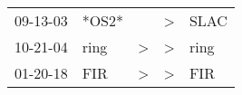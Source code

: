 \begin{supertabular}{lllll}
 09-13-03 &  *OS2* &               &  \textgreater &  SLAC \\
 10-21-04 &   ring &  \textgreater &  \textgreater &  ring \\
 01-20-18 &    FIR &  \textgreater &  \textgreater &   FIR \\
\end{supertabular}

